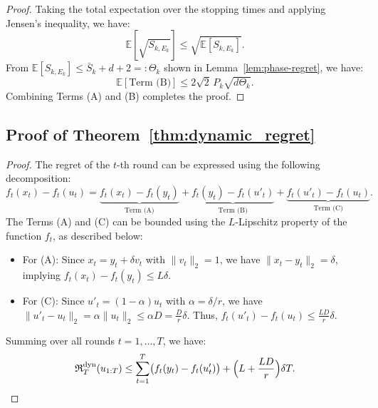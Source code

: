 \documentclass[journal,onecolumn]{IEEEtran}
\theoremstyle{plain}
\theoremstyle{definition}
\theoremstyle{remark}
\newcommand{\regret}{\mathfrak{R}}
\begin{document}
{\begin{proof}
    Taking the total expectation over the stopping times and applying Jensen's
    inequality, we have:
    \begin{equation*}
        \mathbb{E}\left[ \sqrt{S_{k,E_k}}\right] \le \sqrt{\mathbb{E}[S_{k,E_k}]}
        .
    \end{equation*}
    From $\mathbb{E}[S_{k,E_k}]\le \bar S_{k}+ d + 2 =: \Theta_{k}$ shown in
    Lemma~\ref{lem:phase-regret}, we have:
    \begin{equation*}
        \mathbb{E}[\text{Term (B)}] \le 2\sqrt{2}\, P_{k} \sqrt{d \Theta_{k}}.
    \end{equation*}
    Combining Terms (A) and (B) completes the proof.
\end{proof}
\fi

\subsection{Proof of Theorem~\ref{thm:dynamic_regret}}
\begin{proof}
    The regret of the $t$-th round can be expressed using the following decomposition:
    \begin{equation*}
        f_{t}(x_{t})-f_{t}(u_{t}) =\underbrace{f_t(x_t)-f_t(y_t)}_{\text{Term (A)}}
        +\underbrace{f_t(y_t)-f_t(u'_t)}_{\text{Term (B)}}+\underbrace{f_t(u'_t)-f_t(u_t)}
        _{\text{Term (C)}}.
    \end{equation*}
    The Terms (A) and (C) can be bounded using the $L$-Lipschitz property of the function $f_{t}$, as described below:
    \begin{itemize}
        \item For (A): Since $x_{t} = y_{t} + \delta v_{t}$ with
            $\|v_{t}\|_{2}=1$, we have $\|x_{t}-y_{t}\|_{2} = \delta$, implying
            $f_{t}(x_{t})-f_{t}(y_{t}) \le L\delta$.

        \item For (C): Since $u'_{t} = (1-\alpha)u_{t}$ with $\alpha = \delta/r$,
            we have $\|u'_{t}-u_{t}\|_{2} = \alpha\|u_{t}\|_{2} \le \alpha D = \frac{D}{r}
            \delta$. Thus, $f_{t}(u'_{t})-f_{t}(u_{t}) \le \frac{LD}{r}\delta$.
    \end{itemize}
    Summing over all rounds $t=1,\dotsc,T$, we have:
    \begin{equation*}
        \regret^{\mathrm{dyn}}_{T}(u_{1:T}) \le\sum_{t=1}^{T} \bigl(f_{t}(y_{t})-
        f_{t}(u'_{t})\bigr)+ \Bigl(L+\frac{LD}{r}\Bigr)\delta T.
    \end{equation*}


\end{proof}}
\end{document}
